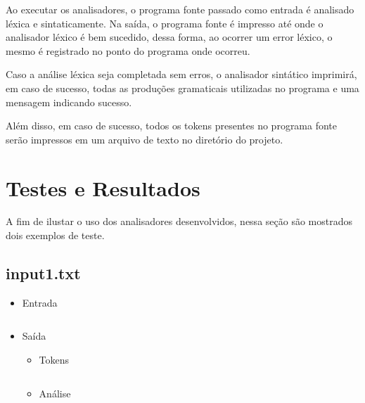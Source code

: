 \documentclass[a4paper,12pt]{report}
\begin{document}
Ao executar os analisadores, o programa fonte passado como entrada é analisado
léxica e sintaticamente. Na saída, o programa fonte é impresso até onde o analisador
léxico é bem sucedido, dessa forma, ao ocorrer um error léxico, o mesmo é registrado
no ponto do programa onde ocorreu.

Caso a análise léxica seja completada sem erros, o analisador sintático imprimirá,
em caso de sucesso, todas as produções gramaticais utilizadas no programa e uma mensagem
indicando sucesso.

Além disso, em caso de sucesso, todos os tokens presentes no programa fonte serão impressos
em um arquivo de texto no diretório do projeto.

\section{Testes e Resultados}

A fim de ilustar o uso dos analisadores desenvolvidos, nessa seção são mostrados
dois exemplos de teste.

\subsection{input1.txt}

\begin{itemize}
 \item Entrada
 
 \begin{mdframed}[linecolor=black, leftline=false, rightline=false]
    \inputminted[linenos, fontsize=\footnotesize]{text}{../src/input/correct4.txt}
\end{mdframed}
 
 \item Saída

 \begin{itemize}
 	\item Tokens

 	\begin{mdframed}[linecolor=black, leftline=false, rightline=false]
    \inputminted[linenos, fontsize=\footnotesize]{text}{../src/tokens4.txt}
	\end{mdframed}

	\item Análise

	\begin{mdframed}[linecolor=black, leftline=false, rightline=false]
    \inputminted[linenos, fontsize=\footnotesize]{text}{../src/correct4.out}
	\end{mdframed}

 \end{itemize}
 
\end{itemize}
\end{document}
